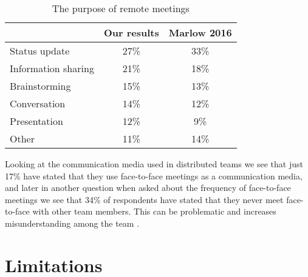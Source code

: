 \begin{table}
\centering
\caption{The purpose of remote meetings} \label{table:remotepurpose}
\begin{tabular}{lcc}
\hline
& \textbf{Our results} & \textbf{Marlow 2016} \\ \hline
Status update&27\%&33\%\\
Information sharing&21\%&18\%\\
Brainstorming&	15\%&	13\%\\
Conversation&	14\%&	12\%\\
Presentation&	12\%&	9\%\\
Other&	11\%&	14\%\\
\hline
\end{tabular}
\end{table}

Looking at the communication media used in distributed teams we see that just 17\% have stated that they use face-to-face meetings as a communication media, and later in another question when asked about the frequency of face-to-face meetings we see that 34\% of respondents have stated that they never meet face-to-face with other team members. This can be problematic and increases misunderstanding among the team \citep{Curtis1988}.


\chapter{Limitations}



